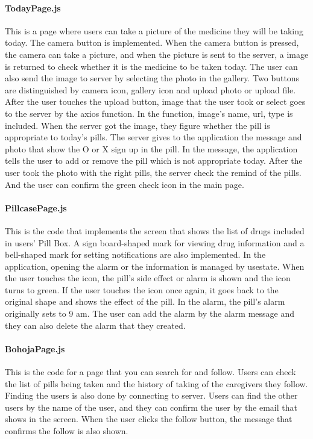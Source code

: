 \documentclass[conference]{IEEEtran}
\begin{document}
\paragraph{TodayPage.js}
This is a page where users can take a picture of the medicine they will be taking today. The camera button is implemented. When the camera button is pressed, the camera can take a picture, and when the picture is sent to the server, a image is returned to check whether it is the medicine to be taken today. The user can also send the image to server by selecting the photo in the gallery. Two buttons are distinguished by camera icon, gallery icon and upload photo or upload file. After the user touches the upload button, image that the user took or select goes to the server by the axios function. In the function, image's name, url, type is included. When the server got the image, they figure whether the pill is appropriate to today's pills. The server gives to the application the message and photo that show the O or X sign up in the pill. In the message, the application tells the user to add or remove the pill which is not appropriate today. After the user took the photo with the right pills, the server check the remind of the pills. And the user can confirm the green check icon in the main page. \\

\paragraph{PillcasePage.js}
This is the code that implements the screen that shows the list of drugs included in users' Pill Box. A sign board-shaped mark for viewing drug information and a bell-shaped mark for setting notifications are also implemented. In the application, opening the alarm or the information is managed by usestate. When the user touches the icon, the pill's side effect or alarm is shown and the icon turns to green. If the user touches the icon once again, it goes back to the original shape and shows the effect of the pill. In the alarm, the pill's alarm originally sets to 9 am. The user can add the alarm by the alarm message and they can also delete the alarm that they created. \\

\paragraph{BohojaPage.js}
This is the code for a page that you can search for and follow. Users can check the list of pills being taken and the history of taking of the caregivers they follow. Finding the users is also done by connecting to server. Users can find the other users by the name of the user, and they can confirm the user by the email that shows in the screen. When the user clicks the follow button, the message that confirms the follow is also shown. \\
\end{document}
